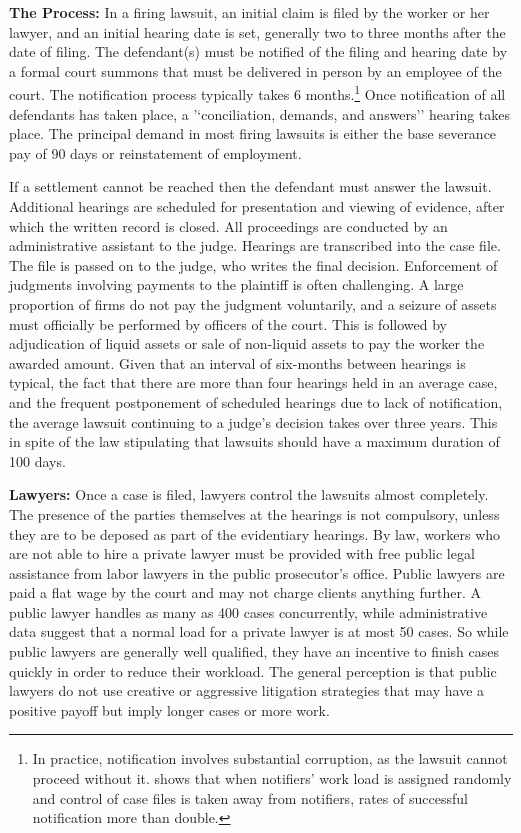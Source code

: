 \textbf{The Process:} In a firing lawsuit, an initial claim is filed by the worker or her lawyer, and an initial hearing date is set, generally two to three months after the date of filing. The defendant(s) must be notified of the filing and hearing date by a formal court summons that must be delivered in person by an employee of the court. The notification process typically takes 6 months.\footnote{In practice, notification involves substantial corruption, as the lawsuit cannot proceed without it.  \cite{KaplanSadka_notif} shows that when notifiers' work load is assigned randomly and control of case files is taken away from notifiers, rates of successful notification more than double.} Once notification of all defendants has taken place, a '`conciliation, demands, and answers'' hearing takes place. The principal demand in most firing lawsuits is either the base severance pay of 90 days or reinstatement of employment. 

If a settlement cannot be reached then the defendant must answer the lawsuit. Additional hearings are scheduled for presentation and viewing of evidence, after which the written record is closed. All proceedings are conducted by an administrative assistant to the judge. Hearings are transcribed into the case file. The file is passed on to the judge, who writes the final decision. Enforcement of judgments involving payments to the plaintiff is often challenging. A large proportion of firms do not pay the judgment voluntarily, and a seizure of assets must officially be performed by officers of the court. This is  followed by adjudication of liquid assets or sale of non-liquid assets to pay the worker the awarded amount. Given that an interval of six-months between hearings is typical, the fact that there are more than four hearings held in an average case, and the frequent postponement of scheduled hearings due to lack of notification, the average lawsuit continuing to a judge's decision takes over three years. This in spite of the law stipulating that lawsuits should have a maximum duration of 100 days. 

\textbf{Lawyers:} Once a case is filed, lawyers control the lawsuits almost completely. The presence of the parties themselves at the hearings is not compulsory, unless they are to be deposed as part of the evidentiary hearings. By law, workers who are not able to hire a private lawyer must be provided with free public legal assistance from labor lawyers in the public prosecutor's office. Public lawyers are paid a flat wage by the court and may not charge  clients anything further. A public lawyer handles as many as 400 cases concurrently, while administrative data suggest that a normal load for a private lawyer is at most 50 cases. So while public lawyers are generally well qualified, they have an incentive to finish cases quickly in order to reduce their workload. The general perception is that public lawyers do not use creative or aggressive litigation strategies that may have a positive payoff but imply longer cases or more work. 

